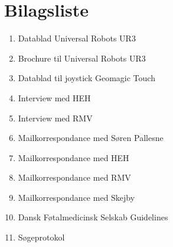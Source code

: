 \chapter{Bilagsliste}
\begin{enumerate}
\item Datablad Universal Robots UR3
\item Brochure til Universal Robots UR3
\item Datablad til joystick Geomagic Touch
\item Interview med HEH
\item Interview med RMV
\item Mailkorrespondance med Søren Pallesne
\item Mailkorrespondance med HEH
\item Mailkorrespondance med RMV
\item Mailkorrespondance med Skejby
\item Dansk Føtalmedicinsk Selskab Guidelines
\item Søgeprotokol
\end{enumerate}

